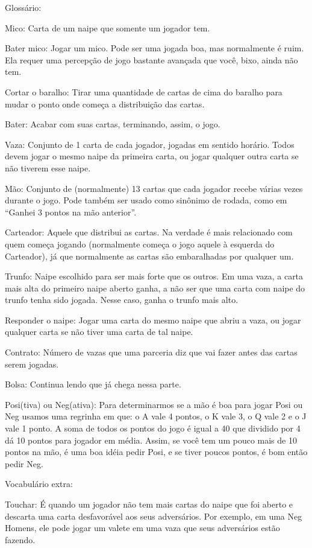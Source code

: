 \begin{subsecao}{Glossário:}

Mico: Carta de um naipe que somente um jogador tem.

Bater mico: Jogar um mico. Pode ser uma jogada boa, mas normalmente é ruim. Ela
requer uma percepção de jogo bastante avançada que você, bixo, ainda não tem.

Cortar o baralho: Tirar uma quantidade de cartas de cima do baralho para mudar
o ponto onde começa a distribuição das cartas.

Bater: Acabar com suas cartas, terminando, assim, o jogo.

Vaza: Conjunto de 1 carta de cada jogador, jogadas em sentido horário. Todos
devem jogar o mesmo naipe da primeira carta, ou jogar qualquer outra carta se
não tiverem esse naipe.

Mão: Conjunto de (normalmente) 13 cartas que cada jogador recebe várias vezes
durante o jogo. Pode também ser usado como sinônimo de rodada, como
em ``Ganhei 3 pontos na mão anterior''.

Carteador: Aquele que distribui as cartas. Na verdade é mais relacionado com
quem começa jogando (normalmente começa o jogo aquele à esquerda do Carteador),
já que normalmente as cartas são embaralhadas por qualquer um.

Trunfo: Naipe escolhido para ser mais forte que os outros. Em uma vaza, a carta
mais alta do primeiro naipe aberto ganha, a não ser que uma carta com naipe do
trunfo tenha sido jogada. Nesse caso, ganha o trunfo mais alto.

Responder o naipe: Jogar uma carta do mesmo naipe que abriu a vaza, ou jogar
qualquer carta se não tiver uma carta de tal naipe.

Contrato: Número de vazas que uma parceria diz que vai fazer antes das cartas
serem jogadas.

Bolsa: Continua lendo que já chega nessa parte.

Posi(tiva) ou Neg(ativa): Para determinarmos se a mão é boa para jogar Posi ou
Neg usamos uma regrinha em que: o A vale 4 pontos, o K vale 3, o Q vale 2 e o J
vale 1 ponto. A soma de todos os pontos do jogo é igual a 40 que dividido por 4
dá 10 pontos para jogador em média. Assim, se você tem um pouco mais de 10
pontos na mão, é uma boa idéia pedir Posi, e se tiver poucos pontos, é bom
então pedir Neg.

Vocabulário extra:

Touchar: É quando um jogador não tem mais cartas do naipe que foi aberto e
descarta uma carta desfavorável aos seus adversários. Por exemplo, em uma Neg
Homens, ele pode jogar um valete em uma vaza que seus adversários estão fazendo.


\end{subsecao}
